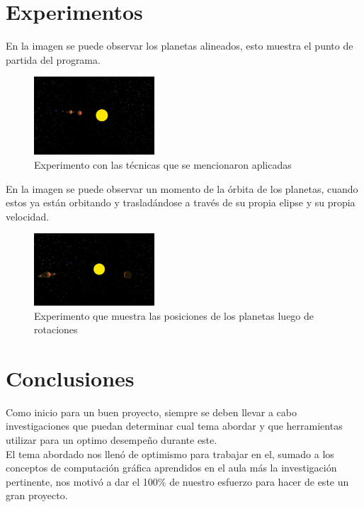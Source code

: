 \documentclass[12pt,journal,compsoc]{IEEEtran}
\begin{document}
\section{Experimentos}
En la imagen se puede observar los planetas alineados, esto muestra el punto de partida del programa.
%
\begin{figure}[h!]
	\includegraphics[width=0.4\textwidth, height=0.25\textwidth]{1.png}
	\centering
	\caption{Experimento con las técnicas que se mencionaron aplicadas}
\end{figure}
%
En la imagen se puede observar un momento de la órbita de los planetas, cuando estos ya están orbitando y trasladándose a través de su propia elipse y su propia velocidad.
%
\begin{figure}[h!]
	\includegraphics[width=0.4\textwidth, height=0.25\textwidth]{2.png}
	\centering
	\caption{Experimento que muestra las posiciones de los planetas luego de rotaciones}
\end{figure}
%
%
\section{Conclusiones}
%
Como inicio para un buen proyecto, siempre se deben llevar a cabo investigaciones que puedan determinar cual tema abordar y que herramientas utilizar para un optimo desempeño durante este.\\
El tema abordado nos llenó de optimismo para trabajar en el, sumado a los conceptos de computación gráfica aprendidos en el aula más la investigación pertinente, nos motivó a dar el 100\% de nuestro esfuerzo para hacer de este un gran proyecto.
%


\end{document}
